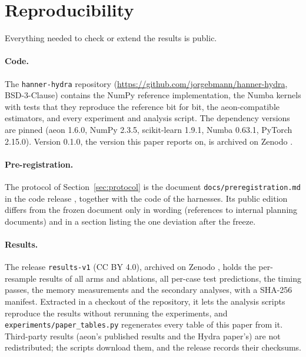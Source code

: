 \section{Reproducibility}
\label{sec:reproducibility}

Everything needed to check or extend the results is public.

\paragraph{Code.} The \texttt{hanner-hydra} repository
(\url{https://github.com/jorgebmann/hanner-hydra}, BSD-3-Clause) contains the NumPy
reference implementation, the Numba kernels with tests that they reproduce the reference bit
for bit, the aeon-compatible estimators, and every experiment and analysis script. The
dependency versions are pinned (aeon 1.6.0, NumPy 2.3.5, scikit-learn 1.9.1, Numba 0.63.1,
PyTorch 2.15.0). Version 0.1.0, the version this paper reports on, is archived on Zenodo
\citep{bahlmann2026code}.

\paragraph{Pre-registration.} The protocol of Section~\ref{sec:protocol} is the document
\texttt{docs/preregistration.md} in the code release \citep{bahlmann2026code}, together
with the code of the harnesses. Its public
edition differs from the frozen document only in wording (references to internal
planning documents) and in a section listing the one deviation after the freeze.

\paragraph{Results.} The release \texttt{results-v1} (CC BY 4.0), archived on Zenodo
\citep{bahlmann2026results}, holds the per-resample
results of all arms and ablations, all per-case test predictions, the timing passes, the
memory measurements and the secondary analyses, with a SHA-256 manifest. Extracted in a
checkout of the repository, it lets the analysis scripts reproduce the results without
rerunning the experiments, and \texttt{experiments/paper\_tables.py} regenerates every
table of this paper from it. Third-party results (aeon's published results and the Hydra
paper's) are not redistributed; the scripts download them, and the release records their
checksums.
